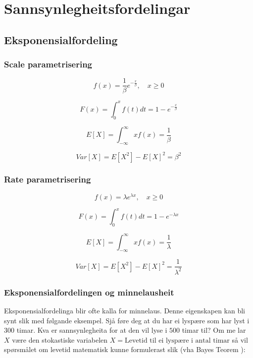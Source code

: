 \chapter{Sannsynlegheitsfordelingar}
\section{Eksponensialfordeling}

\subsection{Scale parametrisering}
\begin{equation}
    f(x) = \frac{1}{\beta} e^{-\frac{x}{\beta}},  \quad  x \geq 0
\end{equation}

\begin{equation}
    F(x) = \int_{0}^x f(t) dt = 1 - e^{-\frac{x}{\beta}}
\end{equation}

\begin{equation}
    E[X] = \int_{-\infty}^{\infty} xf(x) = \frac{1}{\beta}
\end{equation}

\begin{equation}
    Var[X] = E[X^2] - E[X]^2 = \beta^2
\end{equation}

\subsection{Rate parametrisering}

\begin{equation}
    f(x) = \lambda e^{\lambda x},  \quad  x \geq 0
\end{equation}

\begin{equation}
    F(x) = \int_{0}^x f(t) dt = 1 - e^{- \lambda x}
\end{equation}

\begin{equation}
    E[X] = \int_{-\infty}^{\infty} xf(x) = \frac{1}{\lambda}
\end{equation}

\begin{equation}
    Var[X] = E[X^2] - E[X]^2 = \frac{1}{\lambda^2}
\end{equation}

\subsection{Eksponensialfordelingen og minnelausheit}
Eksponensialfordelinga blir ofte kalla for minnelaus. \cite{wiki:memless} Denne eigenskapen kan bli synt slik med følgande eksempel. Sjå føre deg at du har ei lyspære som har lyst i $300$ timar. Kva er sannsynlegheita for at den vil lyse i $500$ timar til? Om me lar $X$ være den stokastiske variabelen $X = \text{Levetid til ei lyspære i antal timar}$ så vil spørsmålet om levetid matematisk kunne formulerast slik (vha Bayes Teorem \cite{wiki:bayes}):

